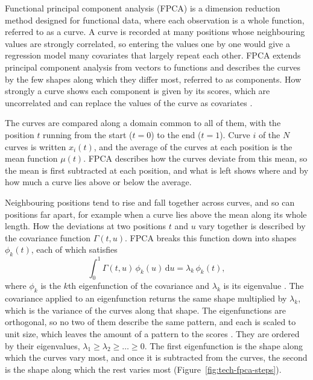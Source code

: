 Functional principal component analysis (FPCA) is a dimension reduction method designed for functional data, where each observation is a whole function, referred to as a curve.
A curve is recorded at many positions whose neighbouring values are strongly correlated, so entering the values one by one would give a regression model many covariates that largely repeat each other.
FPCA extends principal component analysis from vectors to functions and describes the curves by the few shapes along which they differ most, referred to as components.
How strongly a curve shows each component is given by its scores, which are uncorrelated and can replace the values of the curve as covariates \cite{wang2016fda}.

\label{sec:tech-fpca-components}%
The curves are compared along a domain common to all of them, with the position $t$ running from the start ($t = 0$) to the end ($t = 1$).
Curve $i$ of the $N$ curves is written $x_i(t)$, and the average of the curves at each position is the mean function $\mu(t)$.
FPCA describes how the curves deviate from this mean, so the mean is first subtracted at each position, and what is left shows where and by how much a curve lies above or below the average.

Neighbouring positions tend to rise and fall together across curves, and so can positions far apart, for example when a curve lies above the mean along its whole length.
How the deviations at two positions $t$ and $u$ vary together is described by the covariance function $\Gamma(t, u)$.
FPCA breaks this function down into shapes $\phi_k(t)$, each of which satisfies
\begin{equation}
  \int_0^1 \Gamma(t, u)\, \phi_k(u)\, \mathrm{d}u = \lambda_k\, \phi_k(t),
  \label{eq:tech-fpca-eigen}
\end{equation}
where $\phi_k$ is the $k$th eigenfunction of the covariance and $\lambda_k$ is its eigenvalue \cite{wang2016fda}.
The covariance applied to an eigenfunction returns the same shape multiplied by $\lambda_k$, which is the variance of the curves along that shape.
The eigenfunctions are orthogonal, so no two of them describe the same pattern, and each is scaled to unit size, which leaves the amount of a pattern to the scores \cite{wang2016fda}.
They are ordered by their eigenvalues, $\lambda_1 \ge \lambda_2 \ge \dots \ge 0$.
The first eigenfunction is the shape along which the curves vary most, and once it is subtracted from the curves, the second is the shape along which the rest varies most (Figure~\ref{fig:tech-fpca-steps}).

